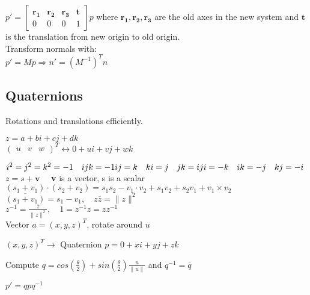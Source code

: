 
$p' = \begin{bmatrix}
    \mathbf{r_1} & \mathbf{r_2} & \mathbf{r_3} & \mathbf{t} \\
    0 & 0 & 0 & 1
\end{bmatrix}p$ where $\mathbf{r_1},\mathbf{r_2},\mathbf{r_3}$ are the old axes in the new system and $\mathbf{t}$ is the translation from new origin to old origin. \\
Transform normals with:\\
$p' = Mp \Rightarrow n' = (M^{-1})^Tn$

\subsection*{Quaternions}
Rotations and translations efficiently. 
\begin{center}
   $z = a + bi + cj + dk$\\
    $\begin{pmatrix}
    u & v & w
    \end{pmatrix}^T \leftrightarrow 0 + ui + vj + wk$
\end{center}
$i^2 = j^2 = k^2 = -1 \quad ijk = -1 \\ ij = k \quad ki = j \quad jk = i \\ ji = -k \quad ik = -j \quad kj = -i$\\
 $z = s + \mathbf{v} \quad$ \textbf{v} is a vector, s is a scalar\\
 $(s_1 + v_1) \cdot (s_2 + v_2) = s_1s_2 - v_1 \cdot v_2 + s_1v_2 + s_2v_1 + v_1 \times v_2$\\
 $\overline{(s_1 + v_1)} = s_1 - v_1, \quad z\overline{z} = \lVert z \rVert ^2 $\\
 $z^{-1} = \frac{\overline{z}}{\lVert z \rVert ^2}, \quad 1 = z^{-1}z = zz^{-1} $\\
 Vector $a = (x, y, z)^T$, rotate around $u$
\begin{compactenum}
    \item $(x,y,z)^T \rightarrow $ Quaternion $p = 0 + xi + yj + zk$
    \item Compute $q = cos(\frac{\theta}{2}) + sin(\frac{\theta}{2})\frac{u}{\lVert u \rVert}$ and $q^{-1} = \overline{q}$
    \item $p' = qpq^{-1}$
\end{compactenum}
    

